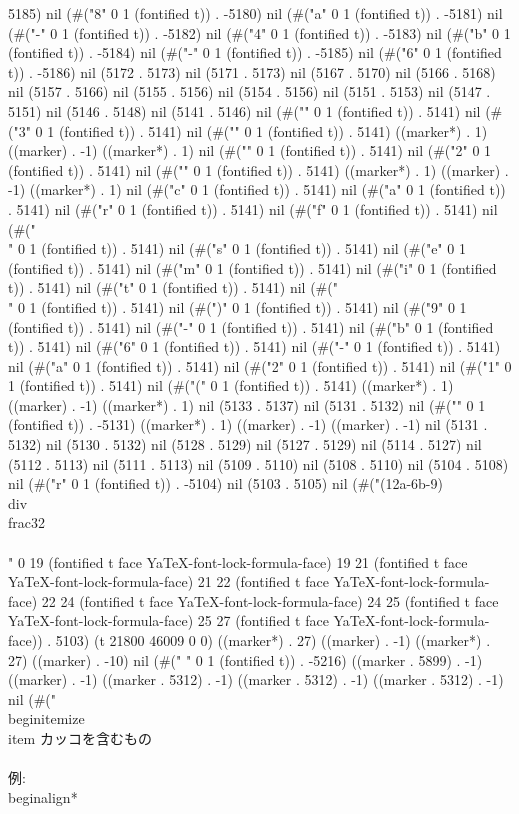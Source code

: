 {5185) nil (#("8" 0 1 (fontified t)) . -5180) nil (#("a" 0 1 (fontified t)) . -5181) nil (#("-" 0 1 (fontified t)) . -5182) nil (#("4" 0 1 (fontified t)) . -5183) nil (#("b" 0 1 (fontified t)) . -5184) nil (#("-" 0 1 (fontified t)) . -5185) nil (#("6" 0 1 (fontified t)) . -5186) nil (5172 . 5173) nil (5171 . 5173) nil (5167 . 5170) nil (5166 . 5168) nil (5157 . 5166) nil (5155 . 5156) nil (5154 . 5156) nil (5151 . 5153) nil (5147 . 5151) nil (5146 . 5148) nil (5141 . 5146) nil (#("}" 0 1 (fontified t)) . 5141) nil (#("3" 0 1 (fontified t)) . 5141) nil (#("{" 0 1 (fontified t)) . 5141) ((marker*) . 1) ((marker) . -1) ((marker*) . 1) nil (#("}" 0 1 (fontified t)) . 5141) nil (#("2" 0 1 (fontified t)) . 5141) nil (#("{" 0 1 (fontified t)) . 5141) ((marker*) . 1) ((marker) . -1) ((marker*) . 1) nil (#("c" 0 1 (fontified t)) . 5141) nil (#("a" 0 1 (fontified t)) . 5141) nil (#("r" 0 1 (fontified t)) . 5141) nil (#("f" 0 1 (fontified t)) . 5141) nil (#("\\" 0 1 (fontified t)) . 5141) nil (#("s" 0 1 (fontified t)) . 5141) nil (#("e" 0 1 (fontified t)) . 5141) nil (#("m" 0 1 (fontified t)) . 5141) nil (#("i" 0 1 (fontified t)) . 5141) nil (#("t" 0 1 (fontified t)) . 5141) nil (#("\\" 0 1 (fontified t)) . 5141) nil (#(")" 0 1 (fontified t)) . 5141) nil (#("9" 0 1 (fontified t)) . 5141) nil (#("-" 0 1 (fontified t)) . 5141) nil (#("b" 0 1 (fontified t)) . 5141) nil (#("6" 0 1 (fontified t)) . 5141) nil (#("-" 0 1 (fontified t)) . 5141) nil (#("a" 0 1 (fontified t)) . 5141) nil (#("2" 0 1 (fontified t)) . 5141) nil (#("1" 0 1 (fontified t)) . 5141) nil (#("(" 0 1 (fontified t)) . 5141) ((marker*) . 1) ((marker) . -1) ((marker*) . 1) nil (5133 . 5137) nil (5131 . 5132) nil (#("}" 0 1 (fontified t)) . -5131) ((marker*) . 1) ((marker) . -1) ((marker) . -1) nil (5131 . 5132) nil (5130 . 5132) nil (5128 . 5129) nil (5127 . 5129) nil (5114 . 5127) nil (5112 . 5113) nil (5111 . 5113) nil (5109 . 5110) nil (5108 . 5110) nil (5104 . 5108) nil (#("r" 0 1 (fontified t)) . -5104) nil (5103 . 5105) nil (#("(12a-6b-9)\\div\\frac{3}{2}\\\\" 0 19 (fontified t face YaTeX-font-lock-formula-face) 19 21 (fontified t face YaTeX-font-lock-formula-face) 21 22 (fontified t face YaTeX-font-lock-formula-face) 22 24 (fontified t face YaTeX-font-lock-formula-face) 24 25 (fontified t face YaTeX-font-lock-formula-face) 25 27 (fontified t face YaTeX-font-lock-formula-face)) . 5103) (t 21800 46009 0 0) ((marker*) . 27) ((marker) . -1) ((marker*) . 27) ((marker) . -10) nil (#("
" 0 1 (fontified t)) . -5216) ((marker . 5899) . -1) ((marker) . -1) ((marker . 5312) . -1) ((marker . 5312) . -1) ((marker . 5312) . -1) nil (#("\\begin{itemize}
  \\item カッコを含むもの \\\\
	例:
	\\begin{align*}
	

